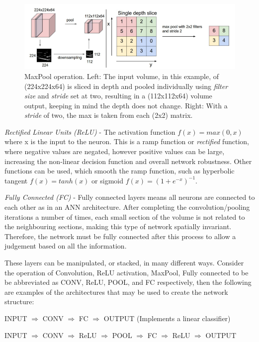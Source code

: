 \documentclass[fleqn,twoside]{article}
\begin{document}
\begin{figure}[h]
	\centering
	\includegraphics[width=\textwidth]{maxpool.png}
	\caption{MaxPool operation. Left: The input volume, in this example, of (224x224x64) is sliced in depth and pooled individually using \textit{filter size} and \textit{stride} set at two, resulting in a (112x112x64) volume output, keeping in mind the depth does not change. Right: With a \textit{stride} of two, the max is taken from each (2x2) matrix.}
	\label{fig:maxpool}
\end{figure}

\textit{Rectified Linear Units (ReLU)} - The activation function $f(x) = max(0, x)$ where x is the input to the neuron. This is a ramp function or \textit{rectified} function, where negative values are negated, however positive values can be large, increasing the non-linear decision function and overall network robustness. Other functions can be used, which smooth the ramp function, such as hyperbolic tangent $f(x) = tanh(x)$ or sigmoid $f(x) = (1+e^{-x})^{-1}$.

\textit{Fully Connected (FC)} - Fully connected layers means all neurons are connected to each other as in an ANN architecture. After completing the  convolution/pooling iterations a number of times, each small section of the volume is not related to the neighbouring sections, making this type of network spatially invariant. Therefore, the network must be fully connected after this process to allow a judgement based on all the information.

These layers can be manipulated, or stacked, in many different ways. Consider the operation of Convolution, ReLU activation, MaxPool, Fully connected to be be abbreviated as CONV, ReLU, POOL, and FC respectively, then the following are examples of the architectures that may be used to create the network structure:


INPUT $\Rightarrow$ CONV $\Rightarrow$ FC $\Rightarrow$ OUTPUT (Implements a linear classifier)

INPUT $\Rightarrow$ CONV $\Rightarrow$ ReLU $\Rightarrow$ POOL $\Rightarrow$ FC $\Rightarrow$ ReLU $\Rightarrow$ OUTPUT
\end{document}
